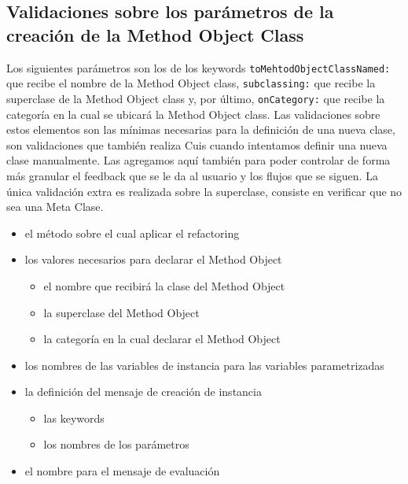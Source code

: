 \subsection*{Validaciones sobre los parámetros de la creación de la Method Object Class}

Los siguientes parámetros son los de los keywords \lstinline{toMehtodObjectClassNamed:} que recibe
el nombre de la Method Object class, \lstinline{subclassing:} que recibe la superclase de la Method
Object class y, por último, \lstinline{onCategory:} que recibe la categoría en la cual se ubicará la
Method Object class. Las validaciones sobre estos elementos son las mínimas necesarias para la
definición de una nueva clase, son validaciones que también realiza Cuis cuando intentamos definir
una nueva clase manualmente. Las agregamos aquí también para poder controlar de forma más granular
el feedback que se le da al usuario y los flujos que se siguen.
La única validación extra es realizada sobre la superclase, consiste en verificar que no sea una
Meta Clase.











\begin{itemize}
    \item el método sobre el cual aplicar el refactoring
    \item los valores necesarios para declarar el Method Object
    \begin{itemize}
        \item el nombre que recibirá la clase del Method Object
        \item la superclase del Method Object
        \item la categoría en la cual declarar el Method Object
    \end{itemize}
    \item los nombres de las variables de instancia para las variables parametrizadas
    \item la definición del mensaje de creación de instancia
    \begin{itemize}
        \item las keywords
        \item los nombres de los parámetros
    \end{itemize}
    \item el nombre para el mensaje de evaluación
\end{itemize}


